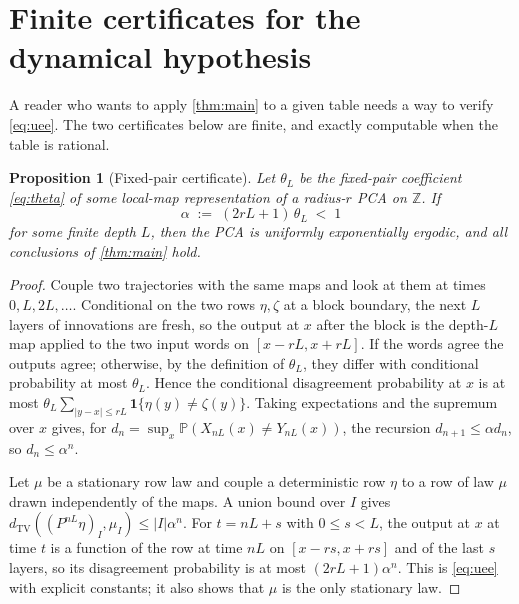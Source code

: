 \documentclass[11pt]{article}
\theoremstyle{plain}
\newtheorem{proposition}[theorem]{Proposition}
\theoremstyle{definition}
\theoremstyle{remark}
\newcommand{\Z}{\mathbb{Z}}
\newcommand{\Prob}{\mathbb{P}}
\newcommand{\dtv}{d_{\mathrm{TV}}}
\begin{document}
\section{Finite certificates for the dynamical hypothesis}
\label{sec:certificates}

A reader who wants to apply \cref{thm:main} to a given table needs a way to verify \eqref{eq:uee}. The two certificates below are finite, and exactly computable when the table is rational.

\begin{proposition}[Fixed-pair certificate]
\label{prop:fixed-pair}
Let $\theta_L$ be the fixed-pair coefficient \eqref{eq:theta} of some local-map representation of a radius-$r$ PCA on $\Z$. If
\begin{equation}
\alpha\;:=\;(2rL+1)\,\theta_L\;<\;1
\label{eq:fixed-pair}
\end{equation}
for some finite depth $L$, then the PCA is uniformly exponentially ergodic, and all conclusions of \cref{thm:main} hold.
\end{proposition}

\begin{proof}
Couple two trajectories with the same maps and look at them at times $0,L,2L,\dots$. Conditional on the two rows $\eta,\zeta$ at a block boundary, the next $L$ layers of innovations are fresh, so the output at $x$ after the block is the depth-$L$ map applied to the two input words on $[x-rL,x+rL]$. If the words agree the outputs agree; otherwise, by the definition of $\theta_L$, they differ with conditional probability at most $\theta_L$. Hence the conditional disagreement probability at $x$ is at most $\theta_L\sum_{|y-x|\le rL}\mathbf 1\{\eta(y)\neq\zeta(y)\}$. Taking expectations and the supremum over $x$ gives, for $d_n=\sup_x\Prob(X_{nL}(x)\neq Y_{nL}(x))$, the recursion $d_{n+1}\le\alpha d_n$, so $d_n\le\alpha^n$.

Let $\mu$ be a stationary row law and couple a deterministic row $\eta$ to a row of law $\mu$ drawn independently of the maps. A union bound over $I$ gives $\dtv((P^{nL}\eta)_I,\mu_I)\le|I|\alpha^n$. For $t=nL+s$ with $0\le s<L$, the output at $x$ at time $t$ is a function of the row at time $nL$ on $[x-rs,x+rs]$ and of the last $s$ layers, so its disagreement probability is at most $(2rL+1)\alpha^n$. This is \eqref{eq:uee} with explicit constants; it also shows that $\mu$ is the only stationary law.
\end{proof}
\end{document}
